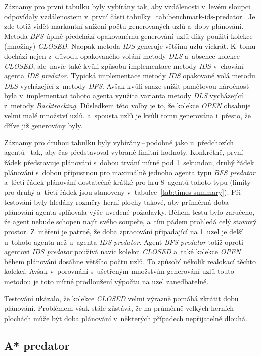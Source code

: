 Záznamy pro první tabulku byly vybírány tak, aby vzdálenosti v~levém sloupci odpovídaly vzdálenostem v~první části tabulky~\ref{tab:benchmark-ids-predator}. Je zde totiž vidět markantní snížení počtu generovaných uzlů a~doby plánování. Metoda \emph{BFS} úplně předchází opakovanému generování uzlů díky použití kolekce (množiny) \emph{CLOSED}. Naopak metoda \emph{IDS} generuje většinu uzlů víckrát. K~tomu dochází nejen z~důvodu opakovaného volání metody \emph{DLS} a~absence kolekce \emph{CLOSED}, ale~navíc také kvůli způsobu implementace metody \emph{IDS} v~chování agenta \emph{IDS predator}. Typická implementace metody \emph{IDS} opakovaně volá metodu \emph{DLS} vycházející z~metody \emph{DFS}. Avšak kvůli snaze snížit paměťovou náročnost byla v~implementaci tohoto agenta využita varianta metody \emph{DLS} vycházející z~metody \emph{Backtracking}. Důsledkem této volby je to, že kolekce \emph{OPEN} obsahuje velmi malé množství uzlů, a~spousta uzlů je kvůli tomu generována i~přesto, že dříve již generovány byly.

Záznamy pro druhou tabulku byly vybírány\,--\,podobně jako u~předchozích agentů\,--\,tak, aby čas představoval vybrané limitní hodnoty. Konkrétně, první řádek představuje plánování s~dobou trvání mírně pod 1~sekundou, druhý řádek plánování s~dobou přípustnou pro maximálně jednoho agenta typu \emph{BFS predator} a~třetí řádek plánování dostatečně krátké pro hru 8~agentů tohoto typu (limity pro druhý a~třetí řádek jsou stanoveny v~tabulce~\ref{tab:times-summary}). Při testování byly hledány rozměry herní plochy takové, aby průměrná doba plánování agenta splňovala výše uvedené požadavky. Během testu bylo zaručeno, že agent nebude schopen najít svého soupeře, a~tím pádem prohledá celý stavový prostor. Z~měření je patrné, že doba zpracování připadající na 1~uzel je delší u~tohoto agenta než u~agenta \emph{IDS predator}. Agent \emph{BFS predator} totiž oproti agentovi \emph{IDS predator} používá navíc kolekci \emph{CLOSED} a~také kolekce \emph{OPEN} během plánování dosáhne většího počtu uzlů. To způsobí několik realokací těchto kolekcí. Avšak v~porovnání s~ušetřeným množstvím generování uzlů touto metodou je toto mírné prodloužení výpočtu na uzel zanedbatelné.

Testování ukázalo, že kolekce \emph{CLOSED} velmi výrazně pomáhá zkrátit dobu plánování. Problémem však stále zůstává, že na průměrně velkých herních plochách může být doba plánování v~některých případech nepřijatelně dlouhá.

\subsection*{A* predator}


